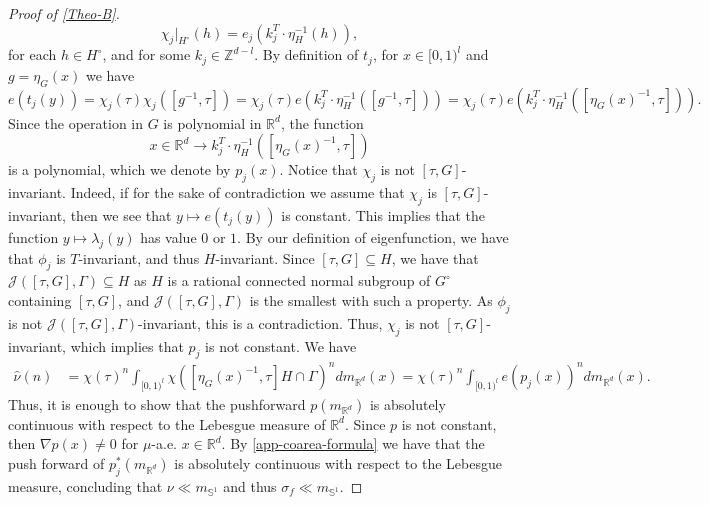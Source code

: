 \documentclass[letter, 11pt]{article}
\theoremstyle{definition}
\theoremstyle{plain}
\newcommand{\Z}{\mathbb{Z}}
\newcommand{\R}{\mathbb{R}}
\newcommand{\bS}{\mathbb{S}}
\newcommand{\1}{\mathbbm{1}}
\begin{document}
\begin{proof}[Proof of \cref{Theo-B}]
$$\chi_j|_{H^\circ}(h)= e_j( k_j^T \cdot \eta_H^{-1}(h) ) ,$$
for each $h\in H^\circ$, and for some $k_j\in \Z^{d-l}$. By definition of $t_j$, for $x\in [0,1)^l$ and $g=\eta_G(x)$ we have
$$e(t_j(y))= \chi_j(\tau) \chi_j([g^{-1},\tau] )= \chi_j(\tau) e( k_j^T \cdot \eta_H^{-1}([g^{-1},\tau] ))=\chi_j(\tau) e( k_j^T \cdot \eta_H^{-1}([\eta_G(x)^{-1},\tau] )). $$
Since the operation in $G$ is polynomial in $\R^d$, the function
$$x\in \R^d \to k_j^T \cdot \eta_H^{-1}([\eta_G(x)^{-1},\tau] ) $$
is a polynomial, which we denote by $p_j(x)$. Notice that $\chi_j$ is not $[\tau,G]$-invariant. Indeed, if for the sake of contradiction we assume that $\chi_j$ is $[\tau,G]$-invariant, then we see that $y\mapsto e(t_j(y))$ is constant. This implies that the function $y\mapsto \lambda_j(y)$ has value $0$ or $1$. By our definition of eigenfunction, we have that $\phi_j$ is $T$-invariant, and thus $H$-invariant. Since $[\tau,G]\subseteq H$, we have that $\mathcal{J}([\tau,G],\Gamma)\subseteq H$  as $H$ is a rational connected normal subgroup of $G^\circ$ containing $[\tau,G]$, and $\mathcal{J}([\tau,G],\Gamma)$ is the smallest with such a property. As $\phi_j$ is not $\mathcal{J}([\tau,G],\Gamma)$-invariant, this is a contradiction. Thus, $\chi_j$ is not $[\tau,G]$-invariant, which implies that $p_j$ is not constant. 
We have  
\begin{align*}
  \widehat{\nu}(n)&= \chi(\tau)^n\int_{[0,1)^l} \chi([\eta_G(x)^{-1},\tau] H\cap \Gamma)^n dm_{\R^d}(x)=\chi(\tau)^n \int_{[0,1)^l} e(p_j(x))^n dm_{\R^d}(x).   
\end{align*}
Thus, it is enough to show that the pushforward $p(m_{\R^d})$ is absolutely continuous with respect to the Lebesgue measure of $\R^d$. Since $p$ is not constant, then $\nabla p(x)\neq 0$ for $\mu$-a.e. $x\in \R^d$. By \cref{app-coarea-formula} we have that the push forward of $p_j^*(m_{\R^d})$ is absolutely continuous with respect to the Lebesgue measure, concluding that $ \nu \ll m_{\bS^1}$ and thus $\sigma_f\ll m_{\bS^1} $.


\end{proof}
\end{document}
